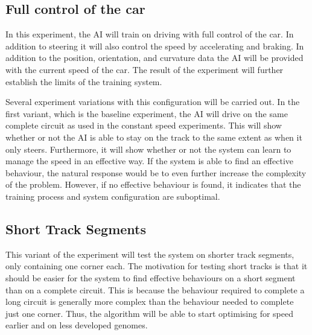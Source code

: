 

\subsection{Full control of the car}
\label{method:baseline}
In this experiment, the AI will train on driving with full control of the car. In addition to steering it will also control the speed by accelerating and braking. In addition to the position, orientation, and curvature data the AI will be provided with the current speed of the car. The result of the experiment will further establish the limits of the training system. 

Several experiment variations with this configuration will be carried out. In the first variant, which is the baseline experiment, the AI will drive on the same complete circuit as used in the constant speed experiments. This will show whether or not the AI is able to stay on the track to the same extent as when it only steers. Furthermore, it will show whether or not the system can learn to manage the speed in an effective way. If the system is able to find an effective behaviour, the natural response would be to even further increase the complexity of the problem. However, if no effective behaviour is found, it indicates that the training process and system configuration are suboptimal. 

\subsection{Short Track Segments}
\label{subsec:shorttracksegment}
This variant of the experiment will test the system on shorter track segments, only containing one corner each. The motivation for testing short tracks is that it should be easier for the system to find effective behaviours on a short segment than on a complete circuit. This is because the behaviour required to complete a long circuit is generally more complex than the behaviour needed to complete just one corner. Thus, the algorithm will be able to start optimising for speed earlier and on less developed genomes. 


